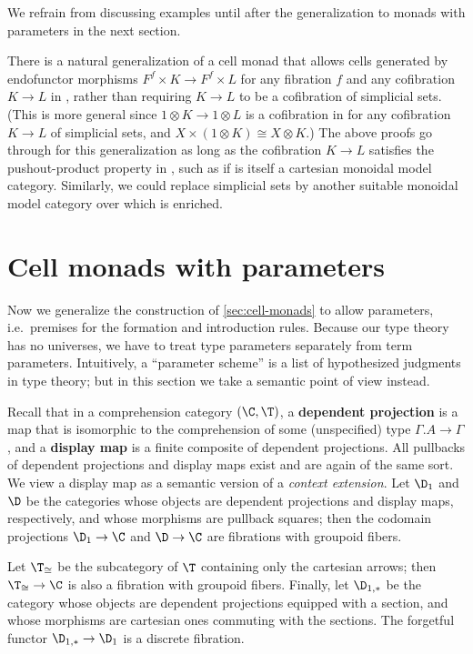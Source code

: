 \begin{enumerate}
\begin{enumerate}
We refrain from discussing examples until after the generalization to monads with parameters in the next section.

\begin{rmk}
  There is a natural generalization of a cell monad that allows cells generated by endofunctor morphisms $F^f\times K \to F^f \times L$ for any fibration $f$ and any cofibration $K\to L$ in \sM, rather than requiring $K\to L$ to be a cofibration of simplicial sets.
  (This is more general since $1\otimes K \to 1\otimes L$ is a cofibration in \sM for any cofibration $K\to L$ of simplicial sets, and $X\times (1\otimes K) \cong X\otimes K$.)
  The above proofs go through for this generalization as long as the cofibration $K\to L$ satisfies the pushout-product property in \sM, such as if \sM is itself a cartesian monoidal model category.
  Similarly, we could replace simplicial sets by another suitable monoidal model category over which \sM is enriched.
\end{rmk}


\section{Cell monads with parameters}
\label{sec:cell-monads-param}

Now we generalize the construction of \cref{sec:cell-monads} to allow parameters, i.e.\ premises for the formation and introduction rules.
Because our type theory has no universes, we have to treat type parameters separately from term parameters.
Intuitively, a ``parameter scheme'' is a list of hypothesized judgments in type theory; but in this section we take a semantic point of view instead.

Recall that in a comprehension category $(\C,\T)$, a \textbf{dependent projection} is a map that is isomorphic to the comprehension of some (unspecified) type $\Gamma.A\to\Gamma$, and a \textbf{display map} is a finite composite of dependent projections.
All pullbacks of dependent projections and display maps exist and are again of the same sort.
We view a display map as a semantic version of a \emph{context extension}.
Let $\D_1$ and $\D$ be the categories whose objects are dependent projections and display maps, respectively, and whose morphisms are pullback squares; then the codomain projections $\D_1\to\C$ and $\D\to\C$ are fibrations with groupoid fibers.

Let $\T_{\cong}$ be the subcategory of $\T$ containing only the cartesian arrows; then $\T_{\cong}\to\C$ is also a fibration with groupoid fibers.
Finally, let $\D_{1,*}$ be the category whose objects are dependent projections equipped with a section, and whose morphisms are cartesian ones commuting with the sections.
The forgetful functor $\D_{1,*} \to \D_1$ is a discrete fibration.


\end{enumerate}
\end{enumerate}
